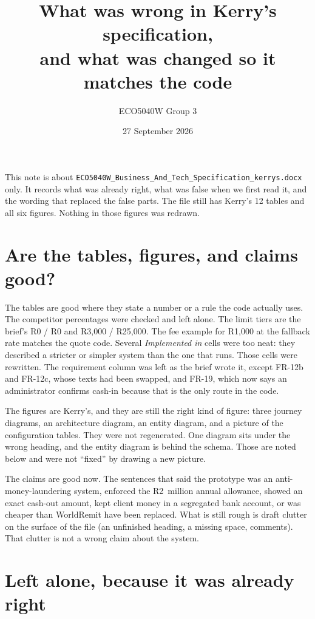 \documentclass[11pt,a4paper]{article}
\title{\vspace{-1.2em}What was wrong in Kerry's specification,\\[0.25em]
\large and what was changed so it matches the code}
\author{ECO5040W Group 3}
\date{27 September 2026}
\begin{document}
\maketitle
\vspace{-1.4em}

This note is about \texttt{ECO5040W\_Business\_And\_Tech\_Specification\_kerrys.docx} only.
It records what was already right, what was false when we first read it, and the wording that replaced the false parts.
The file still has Kerry's 12 tables and all six figures.
Nothing in those figures was redrawn.

\section{Are the tables, figures, and claims good?}

The tables are good where they state a number or a rule the code actually uses.
The competitor percentages were checked and left alone.
The limit tiers are the brief's R0 / R0 and R3{,}000 / R25{,}000.
The fee example for R1{,}000 at the fallback rate matches the quote code.
Several \emph{Implemented in} cells were too neat: they described a stricter or simpler system than the one that runs.
Those cells were rewritten.
The requirement column was left as the brief wrote it, except FR-12b and FR-12c, whose texts had been swapped, and FR-19, which now says an administrator confirms cash-in because that is the only route in the code.

The figures are Kerry's, and they are still the right kind of figure: three journey diagrams, an architecture diagram, an entity diagram, and a picture of the configuration tables.
They were not regenerated.
One diagram sits under the wrong heading, and the entity diagram is behind the schema.
Those are noted below and were not ``fixed'' by drawing a new picture.

The claims are good now.
The sentences that said the prototype was an anti-money-laundering system, enforced the R2~million annual allowance, showed an exact cash-out amount, kept client money in a segregated bank account, or was cheaper than WorldRemit have been replaced.
What is still rough is draft clutter on the surface of the file (an unfinished heading, a missing space, comments).
That clutter is not a wrong claim about the system.

\section{Left alone, because it was already right}
\end{document}
